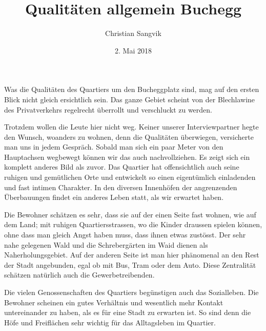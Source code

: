 \documentclass[a4paper,ngerman,11pt]{scrartcl}
\author{Christian Sangvik}
\date{2. Mai 2018}
\title{Qualitäten allgemein Buchegg}
\begin{document}
\maketitle
\noindent{}
Was die Qualitäten des Quartiers um den Bucheggplatz sind, mag auf den ersten
Blick nicht gleich ersichtlich sein. Das ganze Gebiet scheint von der
Blechlawine des Privatverkehrs regelrecht überrollt und verschluckt zu werden.

Trotzdem wollen die Leute hier nicht weg. Keiner unserer Interviewpartner hegte
den Wunsch, woanders zu wohnen, denn die Qualitäten überwiegen, versicherte man
uns in jedem Gespräch. Sobald man sich ein paar Meter von den Hauptachsen
wegbewegt können wir das auch nachvollziehen. Es zeigt sich ein komplett anderes
Bild als zuvor. Das Quartier hat offensichtlich auch seine ruhigen und
gemütlichen Orte und entwickelt so einen eigentümlich einladenden und fast
intimen Charakter. In den diversen Innenhöfen der angrenzenden Überbauungen
findet ein anderes Leben statt, als wir erwartet haben.

Die Bewohner schätzen es sehr, dass sie auf der einen Seite fast wohnen, wie auf
dem Land; mit ruhigen Quartiersstrassen, wo die Kinder draussen spielen können,
ohne dass man gleich Angst haben muss, dass ihnen etwas zustösst. Der sehr nahe
gelegenen Wald und die Schrebergärten im Waid dienen als Naherholungsgebiet. Auf
der anderen Seite ist man hier phänomenal an den Rest der Stadt angebunden, egal
ob mit Bus, Tram oder dem Auto. Diese Zentralität schätzen natürlich auch die
Gewerbetreibenden.

Die vielen Genossenschaften des Quartiers begünstigen auch das Sozialleben. Die
Bewohner scheinen ein gutes Verhältnis und wesentlich mehr Kontakt untereinander
zu haben, als es für eine Stadt zu erwarten ist. So sind denn die Höfe und
Freiflächen sehr wichtig für das Alltagsleben im Quartier.
\end{document}
